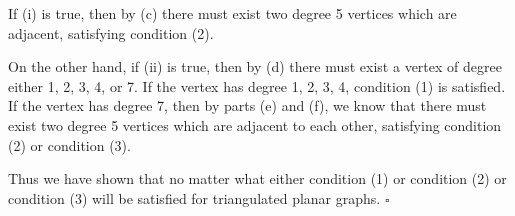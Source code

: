 \begin{enumerate}
\begin{enumerate}
        If (i) is true, then by (c) there must exist two degree 5 vertices which are adjacent, satisfying condition (2). 
        
        On the other hand, if (ii) is true, then by (d) there must exist a vertex of degree either 1, 2, 3, 4, or 7. If the vertex has degree 1, 2, 3, 4, condition (1) is satisfied. If the vertex has degree 7, then by parts (e) and (f), we know that there must exist two degree 5 vertices which are adjacent to each other, satisfying condition (2) or condition (3).
        
        Thus we have shown that no matter what either condition (1) or condition (2) or condition (3) will be satisfied for triangulated planar graphs. $\square$
        
    \end{enumerate}
    
\end{enumerate}